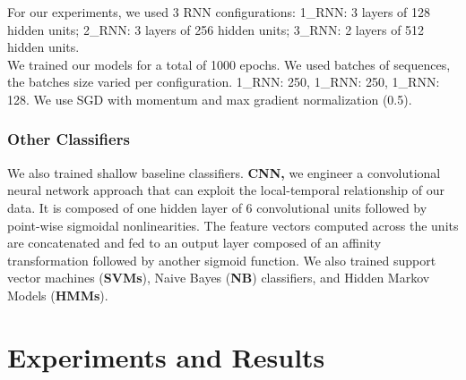 \documentclass{llncs}
\begin{document}
For  our experiments, we used 3 RNN configurations: 1\_RNN: 3 layers of 128 hidden units;  2\_RNN: 3 layers of 256 hidden units;  3\_RNN: 2 layers of 512 hidden units.\\
We trained our models for a total of 1000 epochs. We used batches of sequences, the batches size varied per configuration. 1\_RNN: 250, 1\_RNN: 250, 1\_RNN: 128. We use SGD with momentum and max gradient normalization (0.5).  

\vspace*{-\baselineskip}
\subsubsection {Other Classifiers} We also trained shallow baseline classifiers. {\bf CNN,} we engineer a convolutional neural network approach that can exploit the local-temporal relationship of our data.  It is composed of one hidden layer of 6 convolutional units followed by point-wise sigmoidal nonlinearities. The feature vectors computed across the units are concatenated and fed to an output layer composed of an affinity transformation followed by another sigmoid function. We also trained support vector machines ({\bf SVMs}), Naive Bayes ({\bf NB}) classifiers, and Hidden Markov Models ({\bf HMMs}). %
\vspace*{-\baselineskip}
\section{Experiments and Results}
\end{document}
